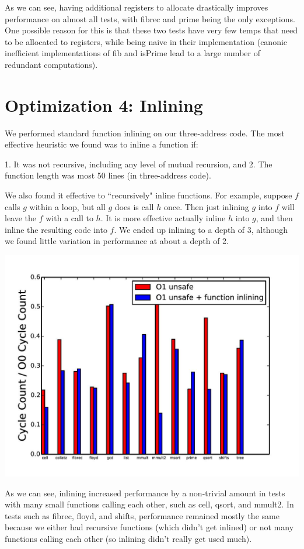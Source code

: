 \documentclass{article}
\begin{document}
As we can see, having additional registers to allocate drastically improves performance on almost all tests, with fibrec and prime being the only exceptions. One possible reason for this is that these two tests have very few temps that need to be allocated to registers, while being naive in their implementation (canonic inefficient implementations of fib and isPrime lead to a large number of redundant computations). 

\section{Optimization 4: Inlining}

We performed standard function inlining on our three-address code. The most effective heuristic we found was to inline a function if:

1. It was not recursive, including any level of mutual recursion, and
2. The function length was most 50 lines (in three-address code).

We also found it effective to ``recursively" inline functions. For example, suppose $f$ calls $g$ within a loop, but all $g$ does is call $h$ once. Then just inlining $g$ into $f$ will leave the $f$ with a call to $h$. It is more effective actually inline $h$ into $g$, and then inline the resulting code into $f$. We ended up inlining to a depth of 3, although we found little variation in performance at about a depth of 2.

\includegraphics[scale=0.5]{O1_vs_inlining-page-001}

As we can see, inlining increased performance by a non-trivial amount in tests with many small functions calling each other, such as cell, qsort, and mmult2. In tests such as fibrec, floyd, and shifts, performance remained mostly the same because we either had recursive functions (which didn't get inlined) or not many functions calling each other (so inlining didn't really get used much). 
\end{document}
